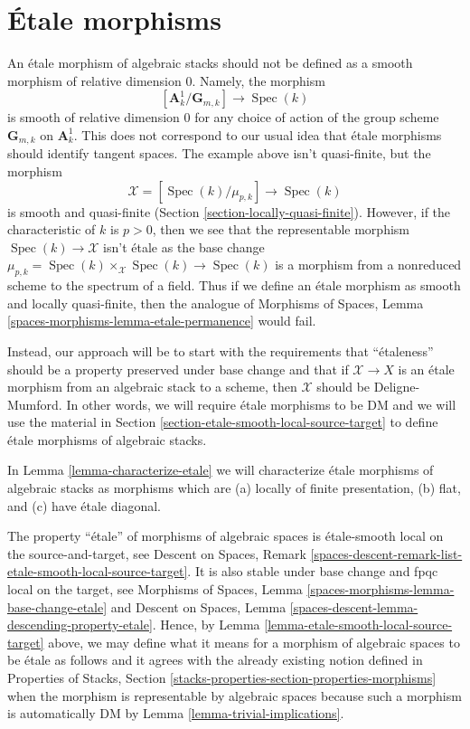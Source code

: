 \documentclass{stacks-project}
\theoremstyle{plain}
\theoremstyle{definition}
\theoremstyle{remark}
\numberwithin{equation}{subsection}
\def\Spec{\mathop{\mathrm{Spec}}}
\begin{document}
\section{\'Etale morphisms}
\label{section-etale}

\noindent
An \'etale morphism of algebraic stacks should not be defined as a
smooth morphism of relative dimension $0$. Namely, the morphism
$$
[\mathbf{A}^1_k/\mathbf{G}_{m, k}] \longrightarrow \Spec(k)
$$
is smooth of relative dimension $0$ for any choice of action
of the group scheme $\mathbf{G}_{m, k}$ on $\mathbf{A}^1_k$.
This does not correspond to our usual idea that \'etale morphisms
should identify tangent spaces. The example above isn't quasi-finite,
but the morphism
$$
\mathcal{X} = [\Spec(k)/\mu_{p, k}] \longrightarrow \Spec(k)
$$
is smooth and quasi-finite (Section \ref{section-locally-quasi-finite}).
However, if the characteristic of $k$ is $p > 0$, then we see
that the representable morphism $\Spec(k) \to \mathcal{X}$
isn't \'etale as the base change
$\mu_{p, k} = \Spec(k) \times_\mathcal{X} \Spec(k) \to \Spec(k)$
is a morphism from a nonreduced scheme to the spectrum of a field.
Thus if we define an \'etale morphism as smooth and locally quasi-finite,
then the analogue of Morphisms of Spaces, Lemma
\ref{spaces-morphisms-lemma-etale-permanence} would fail.

\medskip\noindent
Instead, our approach will be to start with the requirements that
``\'etaleness'' should be a property preserved under base change and that if
$\mathcal{X} \to X$ is an \'etale morphism from an algebraic stack
to a scheme, then $\mathcal{X}$ should be Deligne-Mumford.
In other words, we will require \'etale morphisms to be DM and
we will use the material in
Section \ref{section-etale-smooth-local-source-target} to define
\'etale morphisms of algebraic stacks.

\medskip\noindent
In Lemma \ref{lemma-characterize-etale} we will characterize
\'etale morphisms of algebraic stacks as morphisms which are
(a) locally of finite presentation,
(b) flat, and (c) have \'etale diagonal.

\medskip\noindent
The property ``\'etale'' of morphisms of algebraic spaces
is \'etale-smooth local on the source-and-target, see
Descent on Spaces, Remark
\ref{spaces-descent-remark-list-etale-smooth-local-source-target}.
It is also stable under base change and fpqc local on the target, see
Morphisms of Spaces,
Lemma \ref{spaces-morphisms-lemma-base-change-etale}
and
Descent on Spaces,
Lemma \ref{spaces-descent-lemma-descending-property-etale}.
Hence, by
Lemma \ref{lemma-etale-smooth-local-source-target}
above, we may define what it means for a morphism of algebraic spaces
to be \'etale as follows and it agrees with the already existing notion
defined in Properties of Stacks, Section
\ref{stacks-properties-section-properties-morphisms}
when the morphism is representable by algebraic spaces
because such a morphism is automatically DM by
Lemma \ref{lemma-trivial-implications}.
\end{document}
